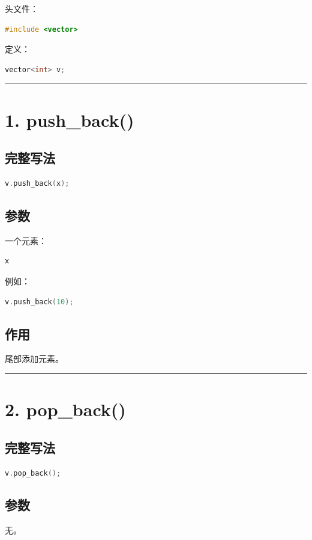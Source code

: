 \documentclass[10pt,twocolumn]{extarticle}
\begin{document}
头文件：
\begin{lstlisting}[language=C++]
#include <vector>
\end{lstlisting}
定义：
\begin{lstlisting}[language=C++]
vector<int> v;
\end{lstlisting}

\noindent\rule{\linewidth}{0.4pt}

\section{1. push\_back()}

\subsection{完整写法}
\begin{lstlisting}[language=C++]
v.push_back(x);
\end{lstlisting}

\subsection{参数}
一个元素：
\begin{lstlisting}[language=C++]
x
\end{lstlisting}
例如：
\begin{lstlisting}[language=C++]
v.push_back(10);
\end{lstlisting}

\subsection{作用}
尾部添加元素。

\noindent\rule{\linewidth}{0.4pt}

\section{2. pop\_back()}

\subsection{完整写法}
\begin{lstlisting}[language=C++]
v.pop_back();
\end{lstlisting}

\subsection{参数}
无。
\end{document}

